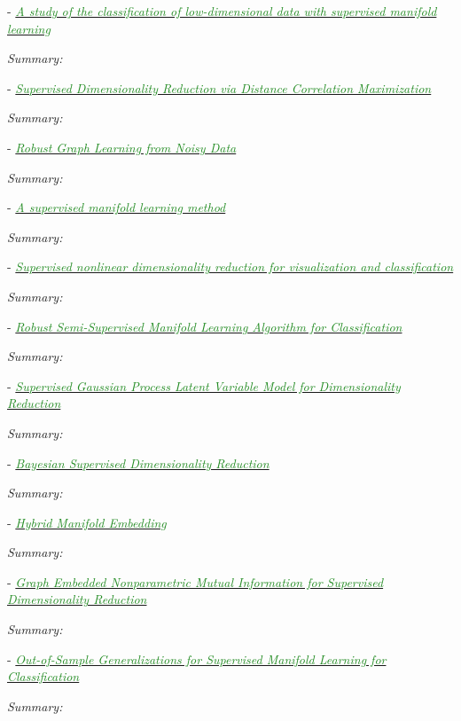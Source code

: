 \documentclass[]{article}
\newcommand{\paperentry}[4]{
            \hangindent=1cm
            \cite{#1} - \href{run:../References/#3}{\textcolor{ForestGreen}{\textit{#2}}}
            
            \noindent            
            \begin{minipage}[t]{0.1\linewidth}\hfill\end{minipage}
            \begin{minipage}[t]{0.8\linewidth}\textcolor{NavyBlue}{{\textit{Summary:}}}#4\end{minipage}
            \vspace{.25cm}
          }
\begin{document}
	\paperentry{Vural2018StudySupervisedManifoldLearning}
	{A study of the classification of low-dimensional data with supervised manifold learning}
	{Manifold_Representation_Learning/Supervised/Vural2018StudySupervisedManifoldLearning.pdf}
	{}
	
	\paperentry{Vepakomma2016SupDimRedDistanceCorrelationMax}
	{Supervised Dimensionality Reduction via Distance Correlation Maximization}
	{Manifold_Representation_Learning/Supervised/Vepakomma2016SupDimRedDistanceCorrelationMax.pdf}
	{}
	
	\paperentry{Kang2018ManifoldRegularizedPCA}
	{Robust Graph Learning from Noisy Data}
	{Manifold_Representation_Learning/Supervised/Kang2018ManifoldRegularizedPCA.pdf}
	{}
	
	\paperentry{Li2009SupManifoldLearning}
	{A supervised manifold learning method}
	{Manifold_Representation_Learning/Supervised/Li2009SupManifoldLearning.pdf}
	{}
	
	\paperentry{Geng2005SupNonlinearDimRed}
	{Supervised nonlinear dimensionality reduction for visualization and classification}
	{Manifold_Representation_Learning/Supervised/Geng2005SupNonlinearDimRed.pdf}
	{}
	
	\paperentry{Chen2018RobustSemiSupManifoldLearning}
	{Robust Semi-Supervised Manifold Learning Algorithm for Classification}
	{Manifold_Representation_Learning/Supervised/Chen2018RobustSemiSupManifoldLearning.pdf}
	{}
	
	\paperentry{Gao2011SupGPLVMDimRed}
	{Supervised Gaussian Process Latent Variable Model for Dimensionality Reduction}
	{Manifold_Representation_Learning/Supervised/Gao2011SupGPLVMDimRed.pdf}
	{}
	
	\paperentry{Gonen2013BayesianSupDimRed}
	{Bayesian Supervised Dimensionality Reduction}
	{Manifold_Representation_Learning/Supervised/Gonen2013BayesianSupDimRed.pdf}
	{}
	
	\paperentry{Liu2014HybridManifoldEmbedding}
	{Hybrid Manifold Embedding}
	{Manifold_Representation_Learning/Supervised/Liu2014HybridManifoldEmbedding.pdf}
	{}
	
	\paperentry{Bouzas2015GraphEmbeddedMutualInformationSupDimRed}
	{Graph Embedded Nonparametric Mutual Information for Supervised Dimensionality Reduction}
	{Manifold_Representation_Learning/Supervised/Bouzas2015GraphEmbeddedMutualInformationSupDimRed.pdf}
	{}
	
	\paperentry{Vural2016OutOfSampleSupManifoldLearning}
	{Out-of-Sample Generalizations for Supervised Manifold Learning for Classification}
	{Manifold_Representation_Learning/Supervised/Vural2016OutOfSampleSupManifoldLearning.pdf}
	{}
	
\end{document}
